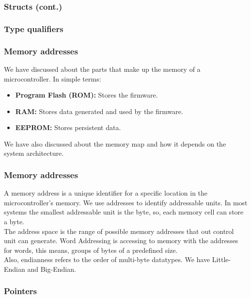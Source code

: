 \documentclass[aspectratio=169]{beamer}
\begin{document}
\begin{frame}
  \frametitle{Structs (cont.)}
\end{frame}

\begin{frame}
  \frametitle{Type qualifiers}
\end{frame}

\begin{frame}
  \frametitle{Memory addresses}
  We have discussed about the parts that make up the memory of a microcontroller. In simple terms: 
  \begin{itemize}
    \item \textbf{Program Flash (ROM):} Stores the firmware.
    \item \textbf{RAM:} Stores data generated and used by the firmware.
    \item \textbf{EEPROM:} Stores persistent data.
  \end{itemize}
  We have also discussed about the memory map and how it depends on the system architecture. 
\end{frame}

\begin{frame}
  \frametitle{Memory addresses}
  A memory address is a unique identifier for a specific location in the microcontroller's memory. \pause
  We use addresses to identify addressable units. In most systems the smallest addressable unit is the byte, so, each memory cell can store a byte. \\ \pause
  The address space is the range of possible memory addresses that out control unit can generate. \pause
  Word Addressing is accessing to memory with the addresses for words, this means, groups of bytes of a predefined size.\\ \pause
  Also, endianness refers to the order of multi-byte datatypes. We have Little-Endian and Big-Endian.
\end{frame}

\begin{frame}
  \frametitle{Pointers}
\end{frame}
\end{document}
